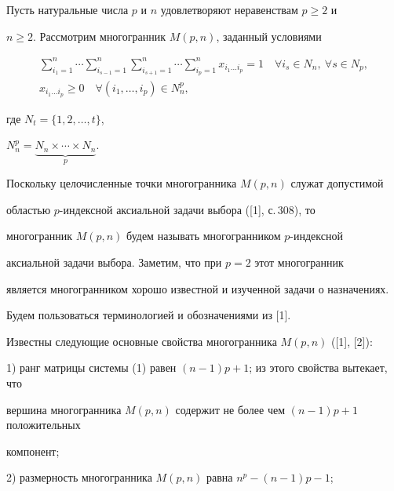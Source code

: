 Пусть натуральные числа $p$ и $n$ удовлетворяют неравенствам $p\geq 2$ и


$n\geq 2$. Рассмотрим многогранник $M(p,n)$, заданный условиями 


\begin{gather}


\sum_{i_1=1}^n\dotsb\sum_{i_{s-1}=1}^n\sum_{i_{s+1}=1}^n\dotsb


\sum_{i_p=1}^n


x_{i_1 \dotsc i_p} =1\quad\forall i_s\in N_n,\ \forall s\in N_p, \\


%


x_{i_1 \dotsc i_p} \geq 0\quad\forall (i_1, \dotsc, i_p)\in N^p_n,


\end{gather}


где $N_t=\{1,2,\dotsc,t\}$,


$N^p_n=\underbrace{N_n\times\dotsb\times N_n}_p$. 


Поскольку целочисленные точки многогранника $M(p,n)$ служат допустимой


областью $p$-индексной аксиальной задачи выбора ([1], с.\,308), то 


многогранник $M(p,n)$ будем называть многогранником $p$-индексной


аксиальной задачи выбора. Заметим, что при $p=2$ этот многогранник


является многогранником хорошо известной и изученной задачи о назначениях.





Будем пользоваться терминологией и обозначениями из [1].





Известны следующие основные свойства многогранника $M(p,n)$ ([1], [2]):





1) ранг матрицы системы (1) равен $(n-1)p+1$; из этого свойства вытекает, что


вершина многогранника $M(p,n)$ содержит не более чем $(n-1)p+1$ положительных


компонент;





2) размерность многогранника $M(p,n)$ равна $n^p-(n-1)p-1$;





